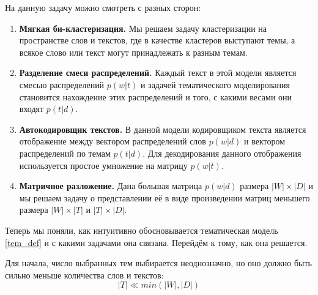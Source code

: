 На данную задачу можно смотреть с разных сторон:
\begin{enumerate}
    \item \textbf{Мягкая би-кластеризация.} Мы решаем задачу кластеризации на пространстве слов и текстов, где в качестве кластеров выступают темы, а всякое слово или текст могут принадлежать к разным темам.
    \item \textbf{Разделение смеси распределений.} Каждый текст в этой модели является смесью распределений $p(w|t)$ и задачей тематического моделирования становится нахождение этих распределений и того, с какими весами они входят $p(t|d)$.
    \item \textbf{Автокодировщик текстов.} В данной модели кодировщиком текста является отображение между вектором распределений слов $p(w|d)$ и вектором распределений по темам $p(t|d)$. Для декодирования данного отображения используется простое умножение на матрицу $p(w|t)$.
    \item \textbf{Матричное разложение.} Дана большая матрица $p(w|d)$ размера $|W|\times|D|$ и мы решаем задачу о представлении её в виде произведении матриц меньшего размера $|W|\times|T|$ и $|T|\times|D|$.
\end{enumerate}

Теперь мы поняли, как интуитивно обосновывается тематическая модель \eqref{tem_def} и с какими задачами она связана. Перейдём к тому, как она решается.

Для начала, число выбранных тем выбирается неоднозначно, но оно должно быть сильно меньше количества слов и текстов:
\begin{equation}
    |T| \ll min(|W|, |D|)
\end{equation}

